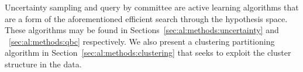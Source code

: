 \noindent Uncertainty sampling and query by committee are active learning 
algorithms that are a form of the aforementioned efficient search through the 
hypothesis space. These algorithms may be found in 
Sections~\ref{sec:al:methods:uncertainty} and ~\ref{sec:al:methods:qbc} 
respectively. We also present a clustering partitioning algorithm in 
Section~\ref{sec:al:methods:clustering} that seeks to exploit the cluster 
structure in the data.
